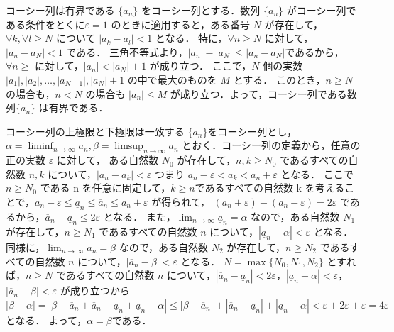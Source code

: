 \documentclass[xelatex,ja=standard,jafont=noto]{bxjsarticle}
\begin{document}
  \begin{lemma}{コーシー列は有界である}{}
   $\{a_n\}$ をコーシー列とする．数列 $\{a_n\}$ がコーシー列である条件をとくに$\varepsilon = 1$ のときに適用すると，ある番号 $N$ が存在して，$\forall k, \forall l \geq N$ について $|a_k - a_l| < 1$ となる．
   特に，$\forall n \geq N$ に対して，$|a_n - a_N| < 1$ である．
   三角不等式より，$|a_n| - |a_N| \leq |a_n - a_N|$であるから，$\forall n \geq$ に対して，$|a_n| < |a_N| + 1$ が成り立つ．
   ここで，$N$ 個の実数 $|a_1|, |a_2|, \ldots, |a_{N-1}|, |a_N| + 1$ の中で最大のものを $M$ とする．
   このとき，$n \geq N$ の場合も，$n < N$ の場合も $|a_n| \leq M$ が成り立つ．よって，コーシー列である数列$\{a_n\}$ は有界である．
  \end{lemma}

  \begin{lemma}{コーシー列の上極限と下極限は一致する}{}
   $\{a_n\}$をコーシー列とし，$\alpha = \displaystyle \liminf_{n \to \infty} a_n, \beta = \limsup_{n \to \infty} a_n$ とおく．コーシー列の定義から，任意の正の実数 $\varepsilon$ に対して，
   ある自然数 $N_0$ が存在して，$n, k \geq N_0$ であるすべての自然数 $n, k$ について，$|a_n - a_k| < \varepsilon$ つまり $a_n - \varepsilon < a_k < a_n+ \varepsilon$ となる．
   ここで $n \geq N_0$ である n を任意に固定して，$k \geq n $であるすべての自然数 k を考えることで，$a_n - \varepsilon \leq \underline{a}_n \leq \overline{a}_n \leq a_n + \varepsilon$ が得られて，
   $(a_n + \varepsilon) - (a_n - \varepsilon ) = 2\varepsilon$ であるから，$\overline{a}_n - \underline{a}_n \leq 2\varepsilon$
   となる．
   また，$\displaystyle \lim_{n \to \infty} \underline{a}_n = \alpha$ なので，ある自然数 $N_1$ が存在して，$n \geq N_1$ であるすべての自然数 $n$ について，$|\underline{a}_n - \alpha| < \varepsilon$ となる．
   同様に，$\displaystyle \lim_{n \to \infty} \overline{a}_n = \beta$ なので，ある自然数 $N_2$ が存在して，$n \geq N_2$ であるすべての自然数 $n$ について，$|\overline{a}_n - \beta| < \varepsilon$ となる．
   $N = \max\{N_0, N_1, N_2\}$ とすれば，$n \geq N$ であるすべての自然数 $n$ について，$|\overline{a}_n - \underline{a}_n| < 2\varepsilon$，$|\underline{a}_n - \alpha| < \varepsilon$，$|\overline{a}_n - \beta| < \varepsilon$ が成り立つから
   $|\beta - \alpha| = |\beta - \overline{a}_n + \overline{a}_n - \underline{a}_n + \underline{a}_n - \alpha| \leq |\beta - \overline{a}_n |+ |\overline{a}_n - \underline{a}_n| + | \underline{a}_n - \alpha| < \varepsilon + 2\varepsilon + \varepsilon = 4\varepsilon$ となる． 
   よって，$\alpha = \beta $である．
  \end{lemma}
\end{document}
